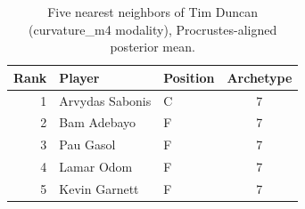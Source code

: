 \begin{table}[htbp]
  \centering\small
  \begin{tabular}{rllc}
    \toprule
    Rank & Player & Position & Archetype \\
    \midrule
    1 & Arvydas Sabonis & C & 7 \\
    2 & Bam Adebayo & F & 7 \\
    3 & Pau Gasol & F & 7 \\
    4 & Lamar Odom & F & 7 \\
    5 & Kevin Garnett & F & 7 \\
    \bottomrule
  \end{tabular}
  \caption{Five nearest neighbors of Tim Duncan (curvature_m4 modality), Procrustes-aligned posterior mean.}
  \label{tab:Tim_Duncan_neighbors_curvature_m4}
\end{table}

